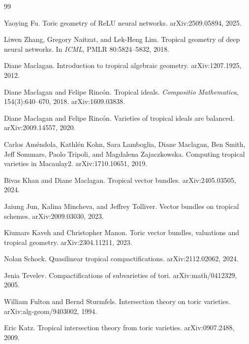 \documentclass[10pt]{article}
\theoremstyle{definition}
\theoremstyle{plain}
\theoremstyle{remark}
\begin{document}
\begin{thebibliography}{99}

Yaoying Fu.
\newblock Toric geometry of ReLU neural networks.
\newblock arXiv:2509.05894, 2025.

Liwen Zhang, Gregory Naitzat, and Lek-Heng Lim.
\newblock Tropical geometry of deep neural networks.
\newblock In \emph{ICML}, PMLR 80:5824--5832, 2018.

Diane Maclagan.
\newblock Introduction to tropical algebraic geometry.
\newblock arXiv:1207.1925, 2012.

Diane Maclagan and Felipe Rinc\'on.
\newblock Tropical ideals.
\newblock \emph{Compositio Mathematica}, 154(3):640--670, 2018. arXiv:1609.03838.

Diane Maclagan and Felipe Rinc\'on.
\newblock Varieties of tropical ideals are balanced.
\newblock arXiv:2009.14557, 2020.

Carlos Am\'endola, Kathl\'en Kohn, Sara Lamboglia, Diane Maclagan, Ben Smith, Jeff Sommars, Paolo Tripoli, and Magdalena Zajaczkowska.
\newblock Computing tropical varieties in Macaulay2.
\newblock arXiv:1710.10651, 2019.

Bivas Khan and Diane Maclagan.
\newblock Tropical vector bundles.
\newblock arXiv:2405.03505, 2024.

Jaiung Jun, Kalina Mincheva, and Jeffrey Tolliver.
\newblock Vector bundles on tropical schemes.
\newblock arXiv:2009.03030, 2023.

Kiumars Kaveh and Christopher Manon.
\newblock Toric vector bundles, valuations and tropical geometry.
\newblock arXiv:2304.11211, 2023.

Nolan Schock.
\newblock Quasilinear tropical compactifications.
\newblock arXiv:2112.02062, 2024.

Jenia Tevelev.
\newblock Compactifications of subvarieties of tori.
\newblock arXiv:math/0412329, 2005.

William Fulton and Bernd Sturmfels.
\newblock Intersection theory on toric varieties.
\newblock arXiv:alg-geom/9403002, 1994.

Eric Katz.
\newblock Tropical intersection theory from toric varieties.
\newblock arXiv:0907.2488, 2009.


\end{thebibliography}
\end{document}
